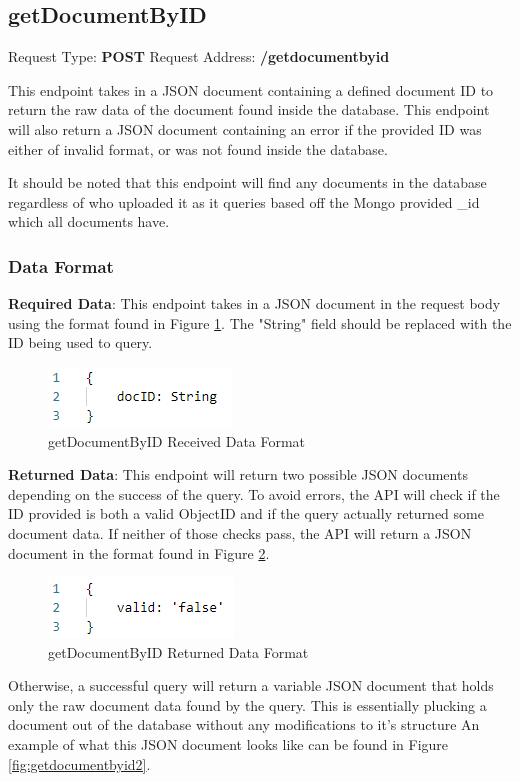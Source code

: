 \subsection{getDocumentByID}
Request Type: \textbf{POST}
\newline
Request Address: \textbf{/getdocumentbyid}
\newline

This endpoint takes in a JSON document containing a defined document ID to return the raw data of the document found inside the database. This endpoint will also return a JSON document containing an error if the provided ID was either of invalid format, or was not found inside the database.

It should be noted that this endpoint will find any documents in the database regardless of who uploaded it as it queries based off the Mongo provided \_id which all documents have.

\subsubsection{Data Format}
\textbf{Required Data}:
\newline
\newline
This endpoint takes in a JSON document in the request body using the format found in Figure \ref{fig:getdocumentbyid1}. The "String" field should be replaced with the ID being used to query.
\begin{figure}[H]
    \centering
    \includegraphics{img/getdocumentbyid1.PNG}
    \caption{getDocumentByID Received Data Format}
    \label{fig:getdocumentbyid1}
\end{figure}
\textbf{Returned Data}:
\newline
\newline
This endpoint will return two possible JSON documents depending on the success of the query. To avoid errors, the API will check if the ID provided is both a valid ObjectID and if the query actually returned some document data. If neither of those checks pass, the API will return a JSON document in the format found in Figure \ref{fig:getdocumentbyid3}.
\begin{figure}[H]
    \centering
    \includegraphics{img/getdocumentbyid3.PNG}
    \caption{getDocumentByID Returned Data Format}
    \label{fig:getdocumentbyid3}
\end{figure}
Otherwise, a successful query will return a variable JSON document that holds only the raw document data found by the query. This is essentially plucking a document out of the database without any modifications to it's structure An example of what this JSON document looks like can be found in Figure \ref{fig:getdocumentbyid2}.

